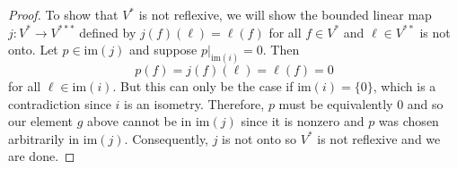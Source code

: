 \documentclass[11pt,oneside,english]{amsart}
\theoremstyle{definition}
\begin{document}
\begin{enumerate}
\begin{proof}
To show that $V^{*}$ is not reflexive, we will show the bounded linear map $j:V^*\to V^{***}$ defined by $j(f)(\ell)=\ell(f)$ for all $f\in V^*$ and $\ell\in V^{**}$ is not onto. Let $p\in\text{im}(j)$ and suppose $p\big|_{\text{im}(i)}=0$. Then
\[
p(f)=j(f)(\ell)=\ell(f)=0
\]
for all $\ell\in\text{im}(i)$. But this can only be the case if $\text{im}(i)= \{0\}$, which is a contradiction since $i$ is an isometry. Therefore, $p$ must be equivalently 0 and so our element $g$ above cannot be in $\text{im}(j)$ since it is nonzero and $p$ was chosen arbitrarily in $\text{im}(j)$. Consequently, $j$ is not onto so $V^*$ is not reflexive and we are done.
\end{proof}

\end{enumerate}
\end{document}
